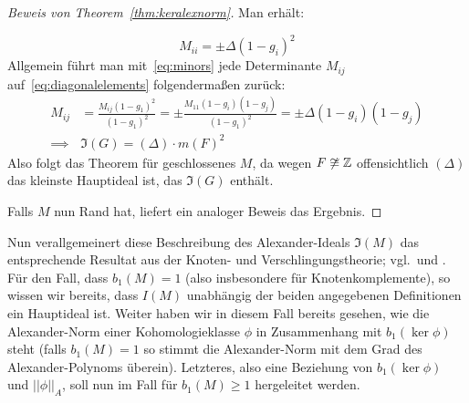 \begin{proof}[Beweis von Theorem~\ref{thm:keralexnorm}]
	Man erhält:
	
	\begin{equation}
		M_{ii}= \pm \Delta (1-g_i)^2 \label{eq:diagonalelements}
	\end{equation}
	Allgemein führt man mit~\eqref{eq:minors} jede Determinante $M_{ij}$ auf~\eqref{eq:diagonalelements} folgendermaßen zurück:
	\begin{align*}
		M_{ij} &= \frac{M_{ij}(1-g_1)^2}{(1-g_1)^2} 
				= \pm \frac{M_{11}(1-g_i)(1-g_j)}{(1-g_1)^2}
				= \pm \Delta (1-g_i)(1-g_j)\\
		\implies &\mathfrak I(G) = (\Delta) \cdot m(F)^2 
	\end{align*}
	Also folgt das Theorem für geschlossenes $M$, da wegen $F\not\cong\mathbb{Z}$ offensichtlich $(\Delta)$ das kleinste Hauptideal ist, das $\mathfrak I(G)$ enthält.

	Falls $M$ nun Rand hat, liefert ein analoger Beweis das Ergebnis. 
\end{proof} 
Nun verallgemeinert diese Beschreibung des Alexander-Ideals $\mathfrak I(M)$ das entsprechende Resultat aus der Knoten- und Verschlingungstheorie; vgl.\,\cite[Proposition~8.11]{Burde.2003} und \cite[Proposition~9.16]{Burde.2003}. Für den Fall, dass $b_1(M)=1$ (also insbesondere für Knotenkomplemente), so wissen wir bereits, dass $I(M)$ unabhängig der beiden angegebenen Definitionen ein Hauptideal ist. Weiter haben wir in diesem Fall bereits gesehen, wie die Alexander-Norm einer Kohomologieklasse $\phi$ in Zusammenhang mit $b_1(\ker \phi)$ steht (falls $b_1(M)=1$ so stimmt die Alexander-Norm mit dem Grad des Alexander-Polynoms überein). Letzteres, also eine Beziehung von $b_1(\ker\phi)$ und $||\phi||_A$, soll nun im Fall für $b_1(M)\geq 1$ hergeleitet werden.

